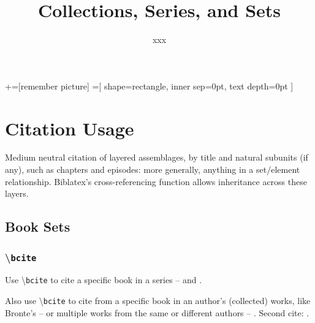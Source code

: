 \documentclass{article}
\title{Collections, Series, and Sets}
\author{xxx}
\newcommand\showcmnd[1]{%
\textbackslash\texttt{#1}%
}
\begin{document}
\maketitle
\tableofcontents
{}+=[remember picture]
=[
	shape=rectangle,
	inner sep=0pt,
	text depth=0pt
]
\section{Citation Usage}
Medium neutral citation of layered assemblages, 
by title and natural subunits (if any), such as chapters and episodes: more generally, anything in a set/element relationship. 
Biblatex's cross-referencing function allows inheritance across these layers.\subsection{Book Sets}
\subsubsection{\showcmnd{bcite}}
Use \showcmnd{bcite} to cite a specific book in a series -- {\color{blue}} and {\color{blue}}.


Also use \showcmnd{bcite} to cite from a specific book in an author's (collected) works, like Bronte's --  {\color{blue}} or multiple works from the same or different authors --  {\color{blue}}. Second cite: {\color{blue}}.

\end{document}
